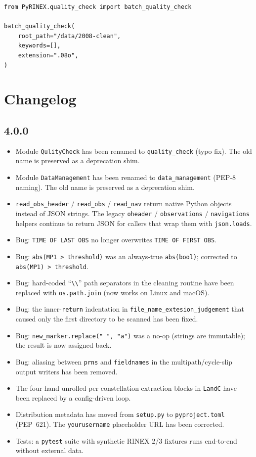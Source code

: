 \documentclass[11pt,a4paper]{article}
\begin{document}
\begin{lstlisting}
from PyRINEX.quality_check import batch_quality_check

batch_quality_check(
    root_path="/data/2008-clean",
    keywords=[],
    extension=".08o",
)
\end{lstlisting}

\section{Changelog}
\label{sec:changelog}

\subsection*{4.0.0}

\begin{itemize}
    \item Module \texttt{QulityCheck} has been renamed to
      \texttt{quality\_check} (typo fix). The old name is preserved
      as a deprecation shim.
    \item Module \texttt{DataManagement} has been renamed to
      \texttt{data\_management} (PEP-8 naming). The old name is
      preserved as a deprecation shim.
    \item \texttt{read\_obs\_header} / \texttt{read\_obs} /
      \texttt{read\_nav} return native Python objects instead of
      JSON strings. The legacy \texttt{oheader} / \texttt{observations}
      / \texttt{navigations} helpers continue to return JSON for
      callers that wrap them with \texttt{json.loads}.
    \item Bug: \texttt{TIME OF LAST OBS} no longer overwrites
      \texttt{TIME OF FIRST OBS}.
    \item Bug: \texttt{abs(MP1 > threshold)} was an always-true
      \texttt{abs(bool)}; corrected to
      \texttt{abs(MP1) > threshold}.
    \item Bug: hard-coded ``\texttt{\textbackslash\textbackslash}''
      path separators in the cleaning routine have been replaced with
      \texttt{os.path.join} (now works on Linux and macOS).
    \item Bug: the inner-\texttt{return} indentation in
      \texttt{file\_name\_extesion\_judgement} that caused only the
      first directory to be scanned has been fixed.
    \item Bug: \texttt{new\_marker.replace(" ", "a")} was a no-op
      (strings are immutable); the result is now assigned back.
    \item Bug: aliasing between \texttt{prns} and \texttt{fieldnames}
      in the multipath/cycle-slip output writers has been removed.
    \item The four hand-unrolled per-constellation extraction blocks
      in \texttt{LandC} have been replaced by a config-driven loop.
    \item Distribution metadata has moved from \texttt{setup.py} to
      \texttt{pyproject.toml} (PEP~621). The \texttt{yourusername}
      placeholder URL has been corrected.
    \item Tests: a \texttt{pytest} suite with synthetic RINEX 2/3
      fixtures runs end-to-end without external data.
\end{itemize}

\bigskip


\end{document}
